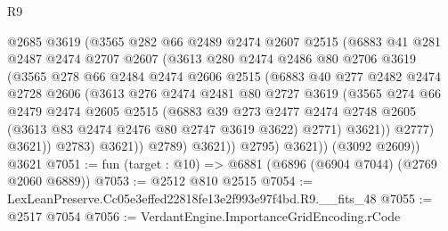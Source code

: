 \begin{lexlean}{R9}
\begin{coremodule}
                    @2685
                    @3619
                    (@3565
                      @282
                      @66
                      @2489
                      @2474
                      @2607
                      @2515
                      (@6883
                        @41
                        @281
                        @2487
                        @2474
                        @2707
                        @2607
                        (@3613
                          @280
                          @2474
                          @2486
                          @80
                          @2706
                          @3619
                          (@3565
                            @278
                            @66
                            @2484
                            @2474
                            @2606
                            @2515
                            (@6883
                              @40
                              @277
                              @2482
                              @2474
                              @2728
                              @2606
                              (@3613
                                @276
                                @2474
                                @2481
                                @80
                                @2727
                                @3619
                                (@3565
                                  @274
                                  @66
                                  @2479
                                  @2474
                                  @2605
                                  @2515
                                  (@6883
                                    @39
                                    @273
                                    @2477
                                    @2474
                                    @2748
                                    @2605
                                    (@3613 @83 @2474 @2476 @80 @2747 @3619 @3622)
                                    @2771)
                                  @3621))
                              @2777)
                            @3621))
                        @2783)
                      @3621))
                  @2789)
                @3621))
            @2795)
          @3621))
      (@3092 @2609))
    @3621
@7051 := fun (target : @10) => @6881 (@6896 (@6904 @7044) (@2769 @2060 @6889))
@7053 := @2512 @810 @2515
@7054 := LexLeanPreserve.Cc05e3effed22818fe13e2f993e97f4bd.R9.__fits_48
@7055 := @2517 @7054
@7056 := VerdantEngine.ImportanceGridEncoding.rCode

\end{coremodule}
\end{lexlean}
